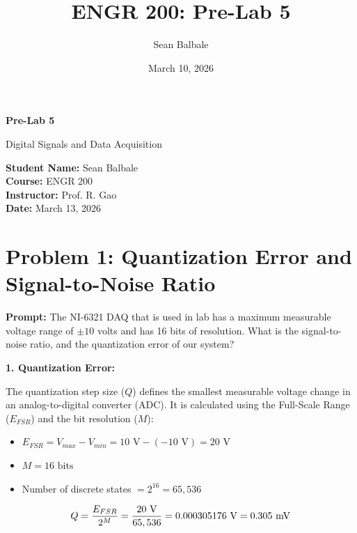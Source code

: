 \documentclass[11pt]{article}
\title{ENGR 200: Pre-Lab 5}
\author{Sean Balbale}
\date{March 10, 2026}
\begin{document}
\begin{titlepage}
  \begin{center}
    \vspace*{1in}

    \Huge
    \textbf{Pre-Lab 5}

    \LARGE
    Digital Signals and Data Acquisition

    \vspace{3in}

    \textbf{Student Name:} Sean Balbale
    \\ \textbf{Course:} ENGR 200
    \\ \textbf{Instructor:} Prof. R. Gao
    \\ \textbf{Date:} March 13, 2026

    \vfill

  \end{center}
\end{titlepage}

\newpage

\section*{Problem 1: Quantization Error and Signal-to-Noise Ratio}

\textbf{Prompt:} The NI-6321 DAQ that is used in lab has a maximum measurable voltage range of $\pm10$ volts and has 16 bits of resolution. What is the signal-to-noise ratio, and the quantization error of our system?

\textbf{1. Quantization Error:}

The quantization step size ($Q$) defines the smallest measurable voltage change in an analog-to-digital converter (ADC). It is calculated using the Full-Scale Range ($E_{FSR}$) and the bit resolution ($M$):
\begin{itemize}
  \item $E_{FSR} = V_{max} - V_{min} = 10 \text{ V} - (-10 \text{ V}) = 20 \text{ V}$
  \item $M = 16 \text{ bits}$
  \item Number of discrete states $= 2^{16} = 65,536$
\end{itemize}

\[ Q = \frac{E_{FSR}}{2^M} = \frac{20 \text{ V}}{65,536} = 0.000305176 \text{ V} = 0.305 \text{ \si{\milli\volt}} \]
\end{document}
